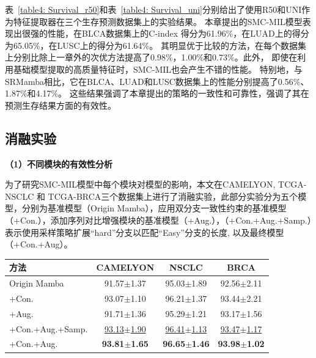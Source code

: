 表~\ref{table4: Survival_r50}和表~\ref{table4: Survival_uni}分别给出了使用R50和UNI作为特征提取器在三个生存预测数据集上的实验结果。
本章提出的SMC-MIL模型表现出很强的性能，在BLCA数据集上的C-index 得分为61.96\%，在LUAD上的得分为65.05\%，在LUSC上的得分为61.64\%。
其明显优于比较的方法，在每个数据集上分别比除上一章外的次优方法提高了0.98\%，1.00\%和0.73\%。此外，
即使在利用基础模型提取的高质量特征时，SMC-MIL也会产生不错的性能。
特别地，与SRMamba相比，它在BLCA、LUAD和LUSC数据集上的性能分别提高了0.56\%、1.87\%和4.17\%。
这些结果强调了本章提出的策略的一致性和可靠性，强调了其在预测生存结果方面的有效性。


\subsection[\hspace{-2pt}消融实验]{{\heiti{} \hspace{-8pt}消融实验}}\label{section4: 消融实验}

\textbf{（1）不同模块的有效性分析}

为了研究SMC-MIL模型中每个模块对模型的影响，本文在CAMELYON, TCGA-NSCLC 和 TCGA-BRCA三个数据集上进行了消融实验，此部分实验分为五个模型，分别为基准模型（Origin Mamba），应用双分支一致性约束的基准模型（+Con.），添加序列对比增强模块的基准模型（+Aug.），（+Con.+Aug.+Samp.）表示使用采样策略扩展“hard”分支以匹配“Easy”分支的长度, 以及最终模型（+Con.+Aug）。

\begin{table}[h!]
  \large    %
  \centering
  \begin{tabularx}{\textwidth}{lCCC}
    \toprule
    方法 & CAMELYON& NSCLC&BRCA\\ \midrule
  Origin Mamba &  91.57$\pm$1.37 & 95.03$\pm$1.89 & 92.56$\pm$2.11  \\
  +Con.  & 93.07$\pm$1.10 &  96.21$\pm$1.37 & 93.44$\pm$2.21 \\
  +Aug.  &  91.71$\pm$1.36 & 95.29$\pm$1.21 &93.17$\pm$1.56 \\
  +Con.+Aug.+Samp.& \underline{93.13$\pm$1.90} &  \underline{96.41$\pm$1.13} & \underline{93.47$\pm$1.17} \\
  +Con.+Aug. &\textbf{93.81$\pm$1.65} &\textbf{96.65$\pm$1.46}  &\textbf{93.98$\pm$1.02} \\
    \bottomrule
  \end{tabularx}
  \label{table4: module ablation}
\end{table}

